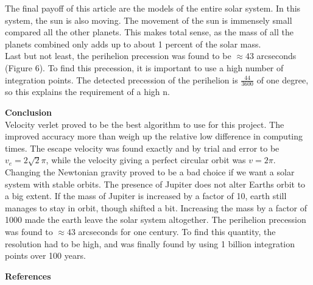 \documentclass[10pt,a4paper]{article}
\begin{document}
\noindent The final payoff of this article are the models of the entire solar system. In this system, the sun is also moving. The movement of the sun is immensely small compared all the other planets. This makes total sense, as the mass of all the planets combined only adds up to about 1 percent of the solar mass.\\ 

\noindent Last but not least, the perihelion precession was found to be $\approx 43$ arcseconds (Figure 6). To find this precession, it is important to use a high number of integration points. The detected precession of the perihelion is $\frac{44}{3600}$ of one degree, so this explains the requirement of a high n. 



  






\newpage
{\LARGE\bf
Conclusion
}\\

\noindent Velocity verlet proved to be the best algorithm to use for this project. The improved accuracy more than weigh up the relative low difference in computing times. The escape velocity was found exactly and by trial and error to be $v_e = 2\sqrt{2}\pi$, while the velocity giving a perfect circular orbit was $v=2\pi$. Changing the Newtonian gravity proved to be a bad choice if we want a solar system with stable orbits. The presence of Jupiter does not alter Earths orbit to a big extent. If the mass of Jupiter is increased by a factor of 10, earth still manages to stay in orbit, though shifted a bit. Increasing the mass by a factor of 1000 made the earth leave the solar system altogether. The perihelion precession was found to $\approx 43$ arcseconds for one century. To find this quantity, the resolution had to be high, and was finally found by using 1 billion integration points over 100 years. 








\newpage
{\LARGE\bf
References
}
\end{document}
